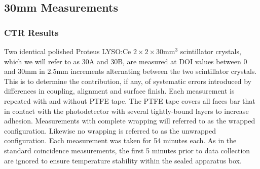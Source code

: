 \subsection{30mm Measurements}
\label{sec:30mm}
\subsubsection{CTR Results}
Two identical polished Proteus LYSO:Ce $2\times2\times30$mm$^3$ scintillator crystals, which we will refer to as 30A and 30B, are measured at DOI values between 0 and 30mm in 2.5mm increments alternating between the two scintillator crystals. This is to determine the contribution, if any, of systematic errors introduced by differences in coupling, alignment and surface finish. Each measurement is repeated with and without PTFE tape. The PTFE tape covers all faces bar that in contact with the photodetector with several tightly-bound layers to increase adhesion. Measurements with complete wrapping will referred to as the wrapped configuration. Likewise no wrapping is referred to as the unwrapped configuration. Each measurement was taken for 54 minutes each. As in the standard coincidence measurements, the first 5 minutes prior to data collection are ignored to ensure temperature stability within the sealed apparatus box.

